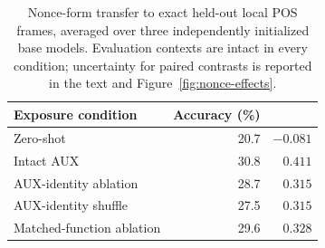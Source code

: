 \begin{table}[t]
\centering
\small
\begin{tabular}{lrr}
\toprule
Exposure condition & Accuracy (\%) & \cps{} \\
\midrule
Zero-shot & 20.7 & $-0.081$ \\
Intact AUX & 30.8 & $0.411$ \\
AUX-identity ablation & 28.7 & $0.315$ \\
AUX-identity shuffle & 27.5 & $0.315$ \\
Matched-function ablation & 29.6 & $0.328$ \\
\bottomrule
\end{tabular}
\caption{Nonce-form transfer to exact held-out local POS frames, averaged over three independently initialized base models. Evaluation contexts are intact in every condition; uncertainty for paired contrasts is reported in the text and Figure~\ref{fig:nonce-effects}.}
\label{tab:nonce}
\end{table}
